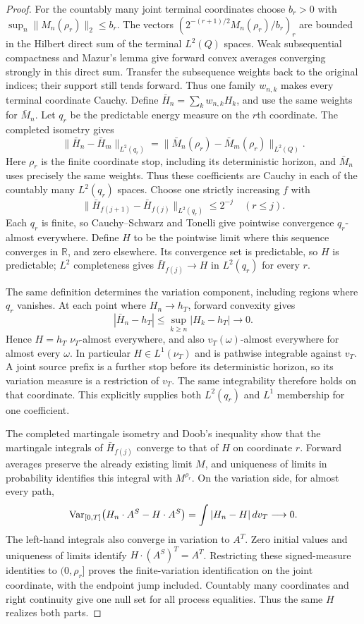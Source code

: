 \begin{proof}
For the countably many joint terminal coordinates choose $b_r>0$ with
$\sup_n\|M_n(\rho_r)\|_2\leq b_r$. The vectors
$(2^{-(r+1)/2}M_n(\rho_r)/b_r)_r$ are bounded in the Hilbert direct sum
of the terminal $L^2(Q)$ spaces. Weak subsequential compactness and Mazur's
lemma give forward convex averages converging strongly in this direct sum.
Transfer the subsequence weights back to the original indices; their support
still tends forward. Thus one family $w_{n,k}$ makes every terminal
coordinate Cauchy. Define $\bar H_n=\sum_kw_{n,k}H_k$, and use the same
weights for $\bar M_n$.
Let $q_r$ be the predictable energy measure on the $r$th coordinate.
The completed isometry gives
\[
 \|\bar H_n-\bar H_m\|_{L^2(q_r)}
 =\|\bar M_n(\rho_r)-\bar M_m(\rho_r)\|_{L^2(Q)}.
\]
Here $\rho_r$ is the finite coordinate stop, including its deterministic
horizon, and $\bar M_n$ uses precisely the same weights.
Thus these coefficients are Cauchy in each of the countably many
$L^2(q_r)$ spaces. Choose one strictly increasing $f$ with
\[
 \|\bar H_{f(j+1)}-\bar H_{f(j)}\|_{L^2(q_r)}\leq2^{-j}
 \quad(r\leq j).
\]
Each $q_r$ is finite, so Cauchy--Schwarz and Tonelli give pointwise convergence
$q_r$-almost everywhere. Define $H$ to be the pointwise limit where this
sequence converges in $\mathbb R$, and zero elsewhere. Its convergence set
is predictable, so $H$ is predictable; $L^2$ completeness gives
$\bar H_{f(j)}\to H$ in $L^2(q_r)$ for every $r$.

The same definition determines the variation component, including regions
where $q_r$ vanishes. At each point where $H_n\to h_T$, forward convexity gives
\[
 |\bar H_n-h_T|\leq\sup_{k\geq n}|H_k-h_T|\longrightarrow0.
\]
Hence $H=h_T$ $\nu_T$-almost everywhere, and also
$v_T(\omega)$-almost everywhere for almost every $\omega$.
In particular $H\in L^1(\nu_T)$ and is pathwise integrable against $v_T$.
A joint source prefix is a further stop before its deterministic horizon,
so its variation measure is a restriction of $v_T$. The same integrability
therefore holds on that coordinate. This explicitly supplies both
$L^2(q_r)$ and $L^1$ membership for one coefficient.

The completed martingale isometry and Doob's inequality show that the
martingale integrals of $\bar H_{f(j)}$ converge to that of $H$ on coordinate
$r$. Forward averages preserve the already existing limit $M$, and uniqueness
of limits in probability identifies this integral with $M^{\rho_r}$.
On the variation side, for almost every path,
\[
 \operatorname{Var}_{[0,T]}\bigl(H_n\cdot A^S-H\cdot A^S\bigr)
 =\int|H_n-H|\,dv_T\longrightarrow0.
\]
The left-hand integrals also converge in variation to $A^T$.
Zero initial values and uniqueness of limits identify $H\cdot(A^S)^T=A^T$.
Restricting these signed-measure identities to $(0,\rho_r]$ proves the
finite-variation identification on the joint coordinate, with the endpoint
jump included. Countably many coordinates and right continuity give one
null set for all process equalities. Thus the same $H$ realizes both parts.
\end{proof}

